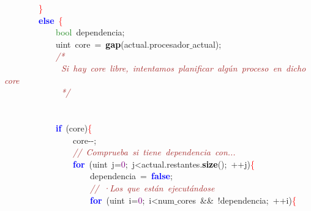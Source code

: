 \mbox{}\ \ \ \ \ \ \ \ \textcolor{Red}{\}} \\
\mbox{}\ \ \ \ \ \ \ \ \textbf{\textcolor{Blue}{else}}\ \textcolor{Red}{\{} \\
\mbox{}\ \ \ \ \ \ \ \ \ \ \ \ \textcolor{ForestGreen}{bool}\ dependencia\textcolor{BrickRed}{;} \\
\mbox{}\ \ \ \ \ \ \ \ \ \ \ \ \textcolor{TealBlue}{uint}\ core\ \textcolor{BrickRed}{=}\ \textbf{\textcolor{Black}{gap}}\textcolor{BrickRed}{(}actual\textcolor{BrickRed}{.}procesador$\_$actual\textcolor{BrickRed}{);} \\
\mbox{}\ \ \ \ \ \ \ \ \ \ \ \ \textit{\textcolor{Brown}{/*}} \\
\mbox{}\textit{\textcolor{Brown}{\ \ \ \ \ \ \ \ \ \ \ \ \ Si\ hay\ core\ libre,\ intentamos\ planificar\ algún\ proceso\ en\ dicho\ core}} \\
\mbox{}\textit{\textcolor{Brown}{\ \ \ \ \ \ \ \ \ \ \ \ \ */}} \\
\mbox{} \\
\mbox{} \\
\mbox{}\ \ \ \ \ \ \ \ \ \ \ \ \textbf{\textcolor{Blue}{if}}\ \textcolor{BrickRed}{(}core\textcolor{BrickRed}{)}\textcolor{Red}{\{} \\
\mbox{}\ \ \ \ \ \ \ \ \ \ \ \ \ \ \ \ core\textcolor{BrickRed}{-\/-;} \\
\mbox{}\ \ \ \ \ \ \ \ \ \ \ \ \ \ \ \ \textit{\textcolor{Brown}{//\ Comprueba\ si\ tiene\ dependencia\ con...}} \\
\mbox{}\ \ \ \ \ \ \ \ \ \ \ \ \ \ \ \ \textbf{\textcolor{Blue}{for}}\ \textcolor{BrickRed}{(}\textcolor{TealBlue}{uint}\ j\textcolor{BrickRed}{=}\textcolor{Purple}{0}\textcolor{BrickRed}{;}\ j\textcolor{BrickRed}{\textless{}}actual\textcolor{BrickRed}{.}restantes\textcolor{BrickRed}{.}\textbf{\textcolor{Black}{size}}\textcolor{BrickRed}{();}\ \textcolor{BrickRed}{++}j\textcolor{BrickRed}{)}\textcolor{Red}{\{} \\
\mbox{}\ \ \ \ \ \ \ \ \ \ \ \ \ \ \ \ \ \ \ \ dependencia\ \textcolor{BrickRed}{=}\ \textbf{\textcolor{Blue}{false}}\textcolor{BrickRed}{;} \\
\mbox{}\ \ \ \ \ \ \ \ \ \ \ \ \ \ \ \ \ \ \ \ \textit{\textcolor{Brown}{//\ ·Los\ que\ están\ ejecutándose}} \\
\mbox{}\ \ \ \ \ \ \ \ \ \ \ \ \ \ \ \ \ \ \ \ \textbf{\textcolor{Blue}{for}}\ \textcolor{BrickRed}{(}\textcolor{TealBlue}{uint}\ i\textcolor{BrickRed}{=}\textcolor{Purple}{0}\textcolor{BrickRed}{;}\ i\textcolor{BrickRed}{\textless{}}num$\_$cores\ \textcolor{BrickRed}{\&\&}\ \textcolor{BrickRed}{!}dependencia\textcolor{BrickRed}{;}\ \textcolor{BrickRed}{++}i\textcolor{BrickRed}{)}\textcolor{Red}{\{} \\
